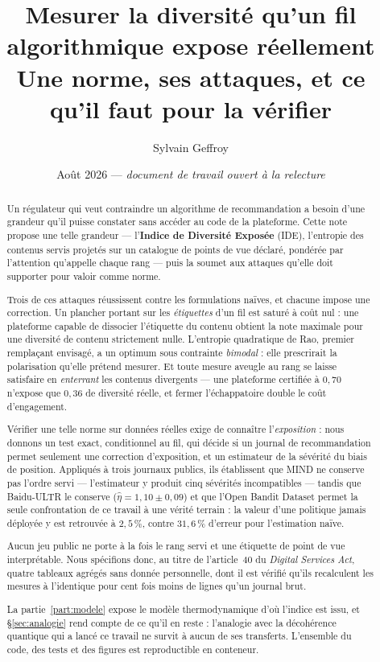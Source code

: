 \documentclass[11pt,a4paper]{article}
\title{\textbf{Mesurer la diversité qu'un fil algorithmique expose réellement}\\[2mm]
       \large Une norme, ses attaques, et ce qu'il faut pour la vérifier}
\author{Sylvain Geffroy}
\date{Août 2026 --- \emph{document de travail ouvert à la relecture}}
\begin{document}
\maketitle

\begin{abstract}
\noindent
Un régulateur qui veut contraindre un algorithme de recommandation a besoin d'une grandeur
qu'il puisse constater sans accéder au code de la plateforme. Cette note propose une telle
grandeur --- l'\textbf{Indice de Diversité Exposée} (IDE), l'entropie des contenus servis
projetés sur un catalogue de points de vue déclaré, pondérée par l'attention qu'appelle
chaque rang --- puis la soumet aux attaques qu'elle doit supporter pour valoir comme norme.

Trois de ces attaques réussissent contre les formulations naïves, et chacune impose une
correction. Un plancher portant sur les \emph{étiquettes} d'un fil est saturé à coût nul :
une plateforme capable de dissocier l'étiquette du contenu obtient la note maximale pour une
diversité de contenu strictement nulle. L'entropie quadratique de Rao, premier remplaçant
envisagé, a un optimum sous contrainte \emph{bimodal} : elle prescrirait la polarisation
qu'elle prétend mesurer. Et toute mesure aveugle au rang se laisse satisfaire en
\emph{enterrant} les contenus divergents --- une plateforme certifiée à $0{,}70$ n'expose
que $0{,}36$ de diversité réelle, et fermer l'échappatoire double le coût d'engagement.

Vérifier une telle norme sur données réelles exige de connaître l'\emph{exposition} : nous
donnons un test exact, conditionnel au fil, qui décide si un journal de recommandation
permet seulement une correction d'exposition, et un estimateur de la sévérité du biais de
position. Appliqués à trois journaux publics, ils établissent que MIND ne conserve pas
l'ordre servi --- l'estimateur y produit cinq sévérités incompatibles --- tandis que
Baidu-ULTR le conserve ($\hat\eta = 1{,}10 \pm 0{,}09$) et que l'Open Bandit Dataset permet
la seule confrontation de ce travail à une vérité terrain : la valeur d'une politique jamais
déployée y est retrouvée à $2{,}5\,\%$, contre $31{,}6\,\%$ d'erreur pour l'estimation naïve.

Aucun jeu public ne porte à la fois le rang servi et une étiquette de point de vue
interprétable. Nous spécifions donc, au titre de l'article~40 du \emph{Digital Services
Act}, quatre tableaux agrégés sans donnée personnelle, dont il est vérifié qu'ils
recalculent les mesures à l'identique pour cent fois moins de lignes qu'un journal brut.

La partie~\ref{part:modele} expose le modèle thermodynamique d'où l'indice est issu, et
\S\ref{sec:analogie} rend compte de ce qu'il en reste : l'analogie avec la décohérence
quantique qui a lancé ce travail ne survit à aucun de ses transferts. L'ensemble du code,
des tests et des figures est reproductible en conteneur.
\end{abstract}
\end{document}

